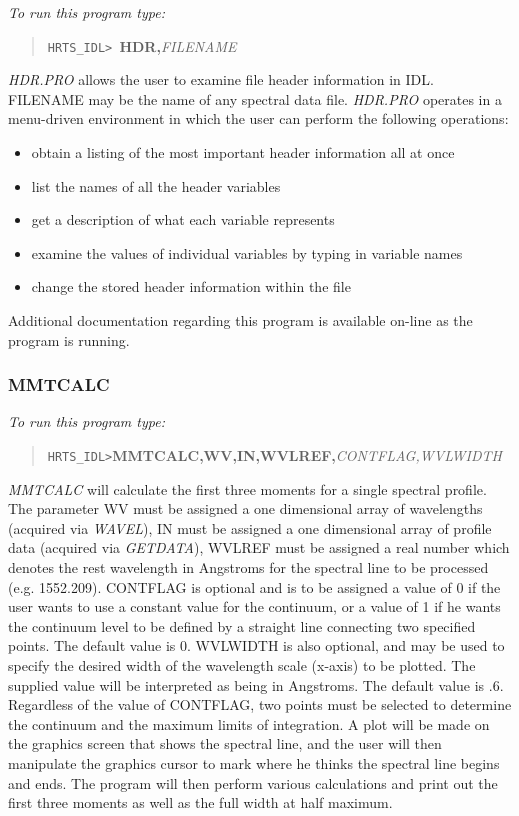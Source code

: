 {\em To run this program type:}
\begin{quote}
{\tt HRTS\_IDL> }{\bf HDR,}{\em FILENAME}                   
\end{quote}
{\em HDR.PRO} allows the user to examine file header information in IDL.
   FILENAME may be the name of any spectral data file. {\em HDR.PRO} operates
   in a menu-driven environment in which the user can perform the
   following operations:
\begin{itemize}                
\item   obtain a listing of the most important header
       information all at once
\item   list the names of all the header variables
\item   get a description of what each variable represents
\item   examine the values of individual variables by typing
       in variable names
\item   change the stored header information within the file

\end{itemize}                
   Additional documentation regarding this program is available on-line
   as the program is running.

\subsubsection{MMTCALC}                

{\em To run this program type:}                                
\begin{quote}
{\tt HRTS\_IDL>}{\bf MMTCALC,WV,IN,WVLREF,}{\it CONTFLAG,WVLWIDTH}                
\end{quote}
{\em MMTCALC} will calculate the first three moments
for a single spectral profile.  The parameter WV must be assigned a one
dimensional array of wavelengths (acquired via {\em WAVEL}), IN must be assigned
a one dimensional array of profile data (acquired via {\em GETDATA}), WVLREF
must be assigned a real number which denotes the rest wavelength in Angstroms
for the spectral line to be processed (e.g. 1552.209).  CONTFLAG is optional
and is to be assigned a value of 0 if the user wants to use a constant value
for the continuum, or a value of 1 if he wants the continuum level to be
defined by a straight line connecting two specified points. The default value
is 0.  WVLWIDTH is also optional, and may be used to specify the desired width
of the wavelength scale (x-axis) to be plotted.  The supplied value will be
interpreted as being in Angstroms. The default value is .6. Regardless of the
value of CONTFLAG, two points must be selected to determine the continuum and
the maximum limits of integration.  A plot will be made on the graphics screen
that shows the spectral line, and the user will then manipulate the graphics
cursor to mark where he thinks the spectral line begins and ends.  The program
will then perform various calculations and print out the first three moments as
well as the full width at half maximum.                                        

